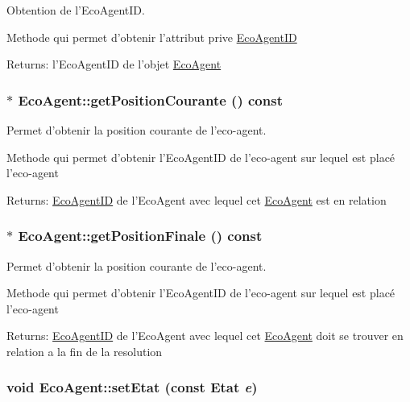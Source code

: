 Obtention de l'EcoAgentID. 

Methode qui permet d'obtenir l'attribut prive \hyperlink{classEcoAgentID}{EcoAgentID}

\begin{Desc}
\item[Returns:]l'EcoAgentID de l'objet \hyperlink{classEcoAgent}{EcoAgent} \end{Desc}
\hypertarget{classEcoAgent_69b3c371f154303f30f3f948a31417f4}{
\subsubsection[{getPositionCourante}]{$\ast$ EcoAgent::getPositionCourante () const}}
\label{classEcoAgent_69b3c371f154303f30f3f948a31417f4}


Permet d'obtenir la position courante de l'eco-agent. 

Methode qui permet d'obtenir l'EcoAgentID de l'eco-agent sur lequel est placé l'eco-agent

\begin{Desc}
\item[Returns:]\hyperlink{classEcoAgentID}{EcoAgentID} de l'EcoAgent avec lequel cet \hyperlink{classEcoAgent}{EcoAgent} est en relation \end{Desc}
\hypertarget{classEcoAgent_f1aeed91b39191c6e73271062e6a97f4}{
\subsubsection[{getPositionFinale}]{$\ast$ EcoAgent::getPositionFinale () const}}
\label{classEcoAgent_f1aeed91b39191c6e73271062e6a97f4}


Permet d'obtenir la position courante de l'eco-agent. 

Methode qui permet d'obtenir l'EcoAgentID de l'eco-agent sur lequel est placé l'eco-agent

\begin{Desc}
\item[Returns:]\hyperlink{classEcoAgentID}{EcoAgentID} de l'EcoAgent avec lequel cet \hyperlink{classEcoAgent}{EcoAgent} doit se trouver en relation a la fin de la resolution \end{Desc}
\hypertarget{classEcoAgent_e06a7430bd88705a327cf498c8420a2b}{
\subsubsection[{setEtat}]{\setlength{\rightskip}{0pt plus 5cm}void EcoAgent::setEtat (const {\bf Etat} {\em e})}}
\label{classEcoAgent_e06a7430bd88705a327cf498c8420a2b}


